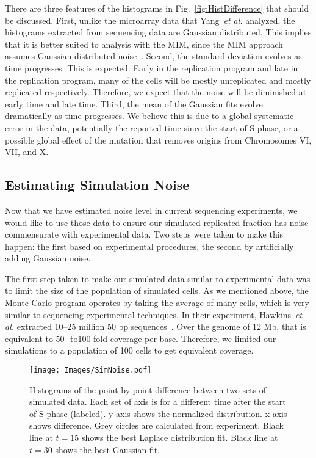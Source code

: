 		There are three features of the histograms in Fig.~\ref{fig:HistDifference} that should be discussed.
		First, unlike the microarray data that Yang~\emph{et al.} analyzed, the histograms extracted from sequencing data are Gaussian distributed.
		This implies that it is better suited to analysis with the MIM, since the MIM approach assumes Gaussian-distributed noise~\cite{ScottsPaper}.
		Second, the standard deviation evolves as time progresses.
		This is expected: Early in the replication program and late in the replication program, many of the cells will be mostly unreplicated and mostly replicated  respectively.
		Therefore, we expect that the noise will be diminished at early time and late time.
		Third, the mean of the Gaussian fits evolve dramatically as time progresses.
		We believe this is due to a global systematic error in the data, potentially the reported time since the start of S phase, or a possible global effect of the mutation that removes origins from Chromosomes VI, VII, and X.
		
		
		\subsection{Estimating Simulation Noise}
		\label{subsec:SimulationNoise}
		
		Now that we have estimated noise level in current sequencing experiments, we would like to use those data to ensure our simulated replicated fraction has noise commensurate with experimental data.
		Two steps were taken to make this happen: the first based on experimental procedures, the second by artificially adding Gaussian noise.
		
		The first step taken to make our simulated data similar to experimental data was to limit the size of the population of simulated cells.
		As we mentioned above, the Monte Carlo program operates by taking the average of many cells, which is very similar to sequencing experimental techniques.
		In their experiment, Hawkins~\emph{et al.} extracted 10--25 million 50 bp sequences~\cite{StochasticTermination}.
		Over the genome of 12 Mb, that is equivalent to 50- to100-fold coverage per base.
		Therefore, we limited our simulations to a population of 100 cells to get equivalent coverage.
		
		\begin{figure}[tbh]
			\begin{center}
				\texttt{[image: Images/SimNoise.pdf]}
			\end{center}
				\caption[Estimating Simulation Noise]{\label{fig:SimNoise} Histograms of the point-by-point difference between two sets of simulated data.
					Each set of axis is for a different time after the start of S phase (labeled).
					y-axis shows the normalized distribution.
					x-axis shows difference.
					Grey circles are calculated from experiment.
					Black line at $t=15$ shows the best Laplace distribution fit.
					Black line at $t=30$ shows the best Gaussian fit.
				}
		\end{figure}
		

